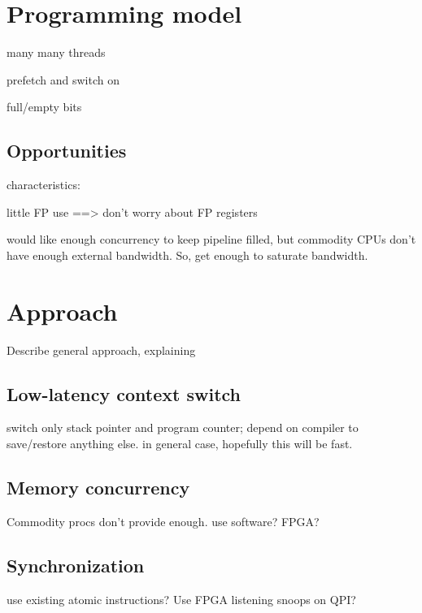 \documentclass{acm_proc_article-sp}
\begin{document}

\section{Programming model}

many many threads

prefetch and switch on 

full/empty bits 

\subsection{Opportunities}

characteristics:



little FP use ==> don't worry about FP registers

would like enough concurrency to keep pipeline filled, but commodity CPUs don't have enough external bandwidth. So, get enough to saturate bandwidth.



\section{Approach}

Describe general approach, explaining 

\subsection{Low-latency context switch}

switch only stack pointer and program counter; depend on compiler to save/restore anything else. in general case, hopefully this will be fast.

\subsection{Memory concurrency}

Commodity procs don't provide enough. use software? FPGA?

\subsection{Synchronization}

use existing atomic instructions? Use FPGA listening snoops on QPI?
\end{document}
